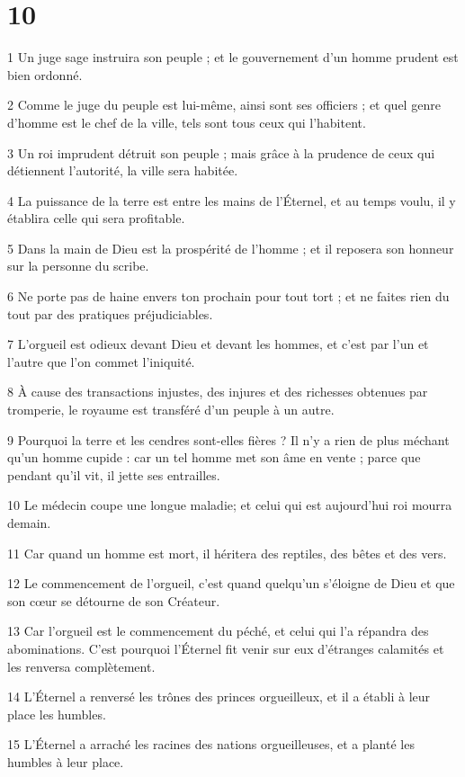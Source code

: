 \chapter{10}

\par 1 Un juge sage instruira son peuple ; et le gouvernement d'un homme prudent est bien ordonné.
\par 2 Comme le juge du peuple est lui-même, ainsi sont ses officiers ; et quel genre d'homme est le chef de la ville, tels sont tous ceux qui l'habitent.
\par 3 Un roi imprudent détruit son peuple ; mais grâce à la prudence de ceux qui détiennent l'autorité, la ville sera habitée.
\par 4 La puissance de la terre est entre les mains de l'Éternel, et au temps voulu, il y établira celle qui sera profitable.
\par 5 Dans la main de Dieu est la prospérité de l'homme ; et il reposera son honneur sur la personne du scribe.
\par 6 Ne porte pas de haine envers ton prochain pour tout tort ; et ne faites rien du tout par des pratiques préjudiciables.
\par 7 L'orgueil est odieux devant Dieu et devant les hommes, et c'est par l'un et l'autre que l'on commet l'iniquité.
\par 8 À cause des transactions injustes, des injures et des richesses obtenues par tromperie, le royaume est transféré d'un peuple à un autre.
\par 9 Pourquoi la terre et les cendres sont-elles fières ? Il n’y a rien de plus méchant qu’un homme cupide : car un tel homme met son âme en vente ; parce que pendant qu'il vit, il jette ses entrailles.
\par 10 Le médecin coupe une longue maladie; et celui qui est aujourd'hui roi mourra demain.
\par 11 Car quand un homme est mort, il héritera des reptiles, des bêtes et des vers.
\par 12 Le commencement de l'orgueil, c'est quand quelqu'un s'éloigne de Dieu et que son cœur se détourne de son Créateur.
\par 13 Car l'orgueil est le commencement du péché, et celui qui l'a répandra des abominations. C'est pourquoi l'Éternel fit venir sur eux d'étranges calamités et les renversa complètement.
\par 14 L'Éternel a renversé les trônes des princes orgueilleux, et il a établi à leur place les humbles.
\par 15 L'Éternel a arraché les racines des nations orgueilleuses, et a planté les humbles à leur place.
